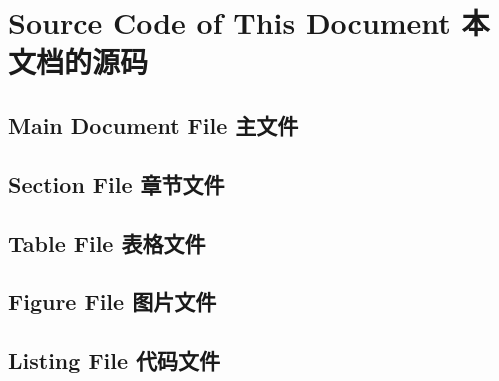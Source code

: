 \section{Source Code of This Document 本文档的源码}

\subsection{Main Document File 主文件}



\subsection{Section File 章节文件}




\subsection{Table File 表格文件}


\subsection{Figure File 图片文件}
 
 



\subsection{Listing File 代码文件}
 
 
 
 
 
 
 
